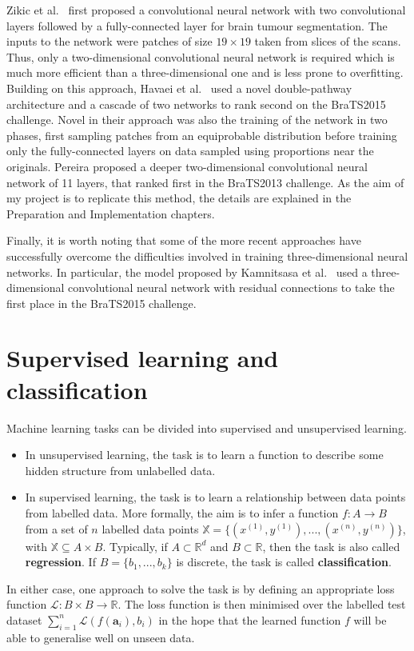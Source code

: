 \documentclass[12pt,a4paper,twoside,openright]{report}
\begin{document}
Zikic et al.\ \cite{zikic} first proposed a convolutional neural network with two convolutional layers followed by a fully-connected layer for brain tumour segmentation. The inputs to the network were patches of size $19 \times 19$ taken from slices of the scans. Thus, only a two-dimensional convolutional neural network is required which is much more efficient than a three-dimensional one and is less prone to overfitting. Building on this approach, Havaei et al.\ \cite{havaei} used a novel double-pathway architecture and a cascade of two networks to rank second on the BraTS2015 challenge. Novel in their approach was also the training of the network in two phases, first sampling patches from an equiprobable distribution before training only the fully-connected layers on data sampled using proportions near the originals. Pereira \cite{pereira} proposed a deeper two-dimensional convolutional neural network of 11 layers, that ranked first in the BraTS2013 challenge. As the aim of my project is to replicate this method, the details are explained in the Preparation and Implementation chapters. 

Finally, it is worth noting that some of the more recent approaches have successfully overcome the difficulties involved in training three-dimensional neural networks. In particular, the model proposed by Kamnitsasa et al.\ \cite{kamnitas} used a three-dimensional convolutional neural network with residual connections \cite{resnet} to take the first place in the BraTS2015 challenge.

\section{Supervised learning and classification}
Machine learning tasks can be divided into supervised and unsupervised learning.
\begin{itemize}
	\item In unsupervised learning, the task is to learn a function to describe some hidden structure from unlabelled data. 
	\item In supervised learning, the task is to learn a relationship between data points from labelled data. More formally, the aim is to infer a function $f: A \to B$ from a set of $n$ labelled data points $\mathbb{X} = \{(x^{(1)}, y^{(1)}), ..., (x^{(n)}, y^{(n)})\}$, with $\mathbb{X} \subseteq A \times B$. Typically, if $A \subset \mathbb{R}^d$ and $B \subset \mathbb{R}$, then the task is also called \textbf{regression}. If $B = \{b_1, ..., b_k\}$ is discrete, the task is called \textbf{classification}. 
\end{itemize} 
In either case, one approach to solve the task is by defining an appropriate loss function $\mathcal{L}: B \times B \to \mathbb{R}$. The loss function is then minimised over the labelled test dataset $\sum_{i=1}^n \mathcal{L}(f(\textbf{a}_i), b_i)$ in the hope that the learned function $f$ will be able to generalise well on unseen data.
\end{document}
